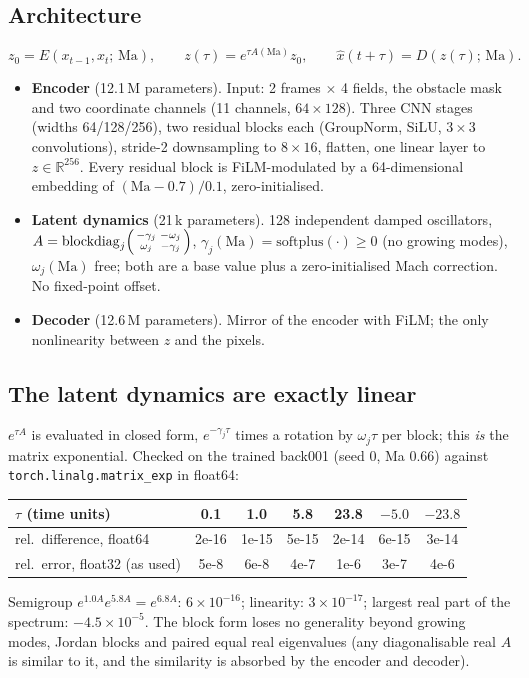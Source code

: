 \documentclass[10.5pt,a4paper]{article}
\begin{document}
\subsection{Architecture}
\begin{equation*}
z_0 = E(x_{t-1}, x_t;\,\mathrm{Ma}),\qquad
z(\tau) = e^{\tau A(\mathrm{Ma})} z_0,\qquad
\hat x(t+\tau) = D(z(\tau);\,\mathrm{Ma}).
\end{equation*}
\begin{itemize}
\item \textbf{Encoder} (12.1\,M parameters). Input: 2 frames $\times$ 4 fields, the obstacle mask
  and two coordinate channels (11 channels, $64\times128$). Three CNN stages (widths 64/128/256),
  two residual blocks each (GroupNorm, SiLU, $3\times3$ convolutions), stride-2 downsampling to
  $8\times16$, flatten, one linear layer to $z\in\mathbb R^{256}$. Every residual block is
  FiLM-modulated by a 64-dimensional embedding of $(\mathrm{Ma}-0.7)/0.1$, zero-initialised.
\item \textbf{Latent dynamics} (21\,k parameters). 128 independent damped oscillators,
  $A=\mathrm{blockdiag}_j\begin{psmallmatrix}-\gamma_j & -\omega_j\\ \omega_j & -\gamma_j\end{psmallmatrix}$,
  $\gamma_j(\mathrm{Ma})=\mathrm{softplus}(\cdot)\ge0$ (no growing modes), $\omega_j(\mathrm{Ma})$
  free; both are a base value plus a zero-initialised Mach correction. No fixed-point offset.
\item \textbf{Decoder} (12.6\,M parameters). Mirror of the encoder with FiLM; the only nonlinearity
  between $z$ and the pixels.
\end{itemize}

\subsection{The latent dynamics are exactly linear}
$e^{\tau A}$ is evaluated in closed form, $e^{-\gamma_j\tau}$ times a rotation by $\omega_j\tau$ per
block; this \emph{is} the matrix exponential. Checked on the trained back001 (seed 0, Ma 0.66)
against \texttt{torch.linalg.matrix\_exp} in float64:

\begin{center}\small
\begin{tabular}{lcccccc}
\toprule
$\tau$ (time units) & 0.1 & 1.0 & 5.8 & 23.8 & $-5.0$ & $-23.8$\\
\midrule
rel.\ difference, float64 & 2e-16 & 1e-15 & 5e-15 & 2e-14 & 6e-15 & 3e-14\\
rel.\ error, float32 (as used) & 5e-8 & 6e-8 & 4e-7 & 1e-6 & 3e-7 & 4e-6\\
\bottomrule
\end{tabular}
\end{center}
Semigroup $e^{1.0A}e^{5.8A}=e^{6.8A}$: $6\times10^{-16}$; linearity: $3\times10^{-17}$; largest
real part of the spectrum: $-4.5\times10^{-5}$. The block form loses no generality beyond
growing modes, Jordan blocks and paired equal real eigenvalues (any diagonalisable real $A$ is
similar to it, and the similarity is absorbed by the encoder and decoder).
\end{document}
